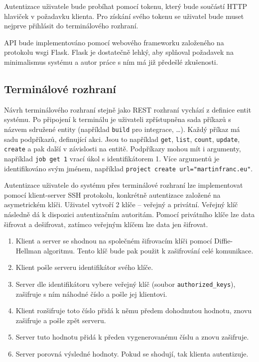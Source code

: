 Autentizace uživatele bude probíhat pomocí tokenu, který bude součástí HTTP hlaviček v požadavku klienta.
Pro získání svého tokenu se uživatel bude muset nejprve přihlásit do terminálového rozhraní.

API bude implementováno pomocí webového frameworku založeného na protokolu wsgi Flask.
Flask je dostatečně lehký, aby splňoval požadavek na minimalismus systému a autor práce s ním má již předešlé zkušenosti.

\subsection{Terminálové rozhraní}

Návrh terminálového rozhraní stejně jako REST rozhraní vychází z definice entit systému.
Po připojení k terminálu je uživateli zpřístupněna sada příkazů s názvem sdružené entity (například \verb|build| pro integrace, \ldots).
Každý příkaz má sadu podpříkazů, definující akci.
Jsou to například \verb|get|, \verb|list|, \verb|count|, \verb|update|, \verb|create| a pak další v závislosti na entitě.
Podpříkazy mohou mít i argumenty, například \verb|job get 1| vrací úkol s identifikátorem 1.
Více argumentů je identifikováno svým jménem, například \verb|project create url="martinfranc.eu"|.

Autentizace uživatele do systému přes terminálové rozhraní lze implementovat pomocí klient-server SSH protokolu, konkrétně autentizace založené na asymetrickém klíči.
Uživatel vytvoří 2 klíče -- veřejný a privátní.
Veřejný klíč následně dá k dispozici autentizačním autoritám.
Pomocí privátního klíče lze data šifrovat a dešifrovat, zatímco veřejným klíčem lze data jen šifrovat.

\begin{enumerate}
    \item Klient a server se shodnou na společném šifrovacím klíči pomocí Diffie-Hellman algoritmu.
    Tento klíč bude pak použit k zašifrování celé komunikace.
    \item Klient pošle serveru identifikátor svého klíče.
    \item Server dle identifikátoru vybere veřejný klíč (soubor \verb|authorized_keys|), zašifruje s ním náhodné číslo a pošle jej klientovi.
    \item Klient rozšifruje toto číslo přidá k němu předem dohodnutou hodnotu, znovu zašifruje a pošle zpět serveru.
    \item Server tuto hodnotu přidá k předen vygenerovanému číslu a znovu zašifruje.
    \item Server porovná výsledné hodnoty. Pokud se shodují, tak klienta autentizuje.
\end{enumerate}

